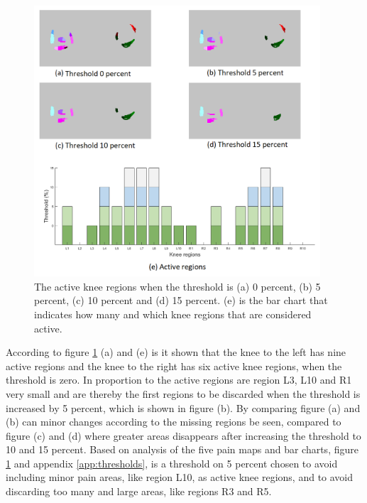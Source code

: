 \begin{figure} [H]
\centering
\includegraphics[width=0.95\textwidth]{figures/threshold4}
\caption{The active knee regions when the threshold is (a) 0 percent, (b) 5 percent, (c) 10 percent and (d) 15 percent. (e) is the bar chart that indicates how many and which knee regions that are considered active.}
\label{fig:threshold}
\end{figure}

\noindent
According to figure \ref{fig:threshold} (a) and (e) is it shown that the knee to the left has nine active regions and the knee to the right has six active knee regions, when the threshold is zero. In proportion to the active regions are region L3, L10 and R1 very small and are thereby the first regions to be discarded when the threshold is increased by 5 percent, which is shown in figure (b).
By comparing figure (a) and (b) can minor changes according to the missing regions be seen, compared to figure (c) and (d) where greater areas disappears after increasing the threshold to 10 and 15 percent.
\noindent
Based on analysis of the five pain maps and bar charts, figure \ref{fig:threshold} and appendix \ref{app:thresholds}, is a threshold on 5 percent chosen to avoid including minor pain areas, like region L10, as active knee regions, and to avoid discarding too many and large areas, like regions R3 and R5.


